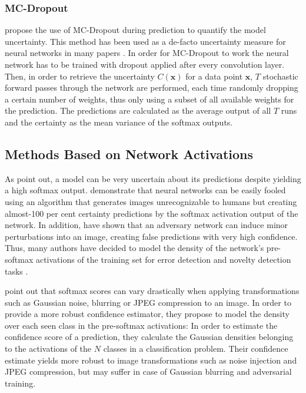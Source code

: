 \documentclass[10pt]{article}
\begin{document}
\subsubsection{MC-Dropout}
\textcite{ghahramani} propose the use of \gls{MC-Dropout} during prediction to quantify the model uncertainty. This method has been used as a de-facto uncertainty measure for neural networks in many papers \cite{mandelbaum17, leibig2017, Lakshminarayanan16, subramanya, Kampffmeyer2016SemanticSO}. In order for \gls{MC-Dropout} to work the neural network has to be trained with dropout applied after every convolution layer. Then, in order to retrieve the uncertainty $C(\mathbf{x})$ for a data point $\mathbf{x}$,  $T$ stochastic forward passes through the network are performed, each time randomly dropping a certain number of weights, thus only using a subset of all available weights for the prediction. The predictions are calculated as the average output of all $T$ runs and the certainty as the mean variance of the softmax outputs.

\subsection{Methods Based on Network Activations}
\label{subsec:pre-softmax}
As \textcite{ghahramani} point out, a model can be very uncertain about its predictions despite yielding a high softmax output. \textcite{NguyenYC14} demonstrate that neural networks can be easily fooled using an algorithm that generates images unrecognizable to humans but creating almost-100 per cent certainty predictions by the softmax activation output of the network. In addition, \textcite{Goodfellow2014} have shown that an adversary network can induce minor perturbations into an image, creating false predictions with very high confidence. Thus, many authors have decided to model the density of the network's pre-softmax activations of the training set for error detection and novelty detection tasks \cite{subramanya, mandelbaum17, Bishop1994NoveltyDA}.

\textcite{subramanya} point out that softmax scores can vary drastically when applying transformations such as Gaussian noise, blurring or JPEG compression to an image. In order to provide a more robust confidence estimator, they propose to model the density over each seen class in the pre-softmax activations: In order to estimate the confidence score of a prediction, they calculate the Gaussian densities belonging to the activations of the $N$ classes in a classification problem. Their confidence estimate yields more robust to image transformations such as noise injection and JPEG compression, but may suffer in case of Gaussian blurring and adversarial training.
\end{document}
